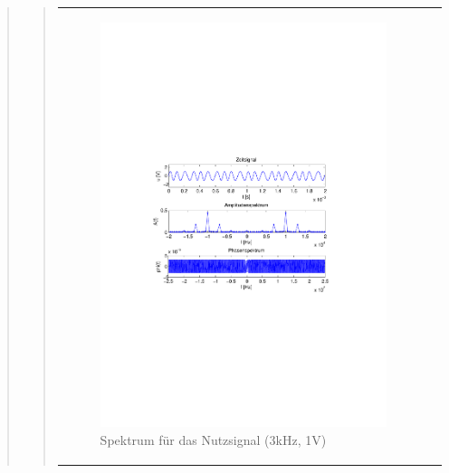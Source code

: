 \begin{quote}
\begin{quote}
\begin{center}
\begin{tabular}{ll}
\begin{minipage}{0.6\textwidth}
                    \begin{figure}[H]
                        \label{fig:}
                        \includegraphics[scale=0.5, trim = 2cm 6.5cm 1.5cm
                        8.5cm, clip]{./Bilder/spektrum_sin3kHz}
                        \caption{Spektrum für das Nutzsignal (3kHz, 1V)}
                    \end{figure}

                \end{minipage}
                \begin{minipage}{0.6\textwidth}


\end{minipage}
\end{tabular}
\end{center}
\end{quote}
\end{quote}
